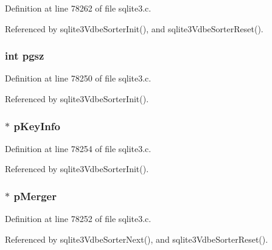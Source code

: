 Definition at line 78262 of file sqlite3.\+c.



Referenced by sqlite3\+Vdbe\+Sorter\+Init(), and sqlite3\+Vdbe\+Sorter\+Reset().

\hypertarget{struct_vdbe_sorter_a286de60ddf262ee4d36ee947f4ae00c9}{}
\subsubsection[{pgsz}]{\setlength{\rightskip}{0pt plus 5cm}int pgsz}\label{struct_vdbe_sorter_a286de60ddf262ee4d36ee947f4ae00c9}


Definition at line 78250 of file sqlite3.\+c.



Referenced by sqlite3\+Vdbe\+Sorter\+Init().

\hypertarget{struct_vdbe_sorter_a2394c1e8402fe40753205256757b4165}{}
\subsubsection[{p\+Key\+Info}]{$\ast$ p\+Key\+Info}\label{struct_vdbe_sorter_a2394c1e8402fe40753205256757b4165}


Definition at line 78254 of file sqlite3.\+c.



Referenced by sqlite3\+Vdbe\+Sorter\+Init().

\hypertarget{struct_vdbe_sorter_ab9ebb5ec47cc445078cf9ffb98b9e66f}{}
\subsubsection[{p\+Merger}]{$\ast$ p\+Merger}\label{struct_vdbe_sorter_ab9ebb5ec47cc445078cf9ffb98b9e66f}


Definition at line 78252 of file sqlite3.\+c.



Referenced by sqlite3\+Vdbe\+Sorter\+Next(), and sqlite3\+Vdbe\+Sorter\+Reset().

\hypertarget{struct_vdbe_sorter_a3313718acd02fe735e372faedbf6e369}{}
